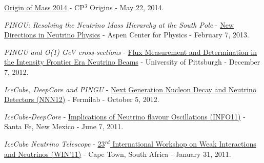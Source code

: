 \documentclass[a4paper,11pt]{article}
\begin{document}
\begin{multicols}{2}
\begin{etaremune}[topsep=0pt,itemsep=4pt,partopsep=0pt,parsep=0pt]
{\href{http://cp3-origins.dk/events/meetings/mass2014}{Origin of Mass 2014} - CP$^3$ Origins - May 22, 2014.}
%
\item{\textit{PINGU: Resolving the Neutrino Mass Hierarchy at the South Pole} - 
\href{https://indico.cern.ch/event/224351/}{New Directions in Neutrino Physics} - Aspen Center for Physics  - February 7, 2013.}
%
\item{ \textit{PINGU and O(1) GeV cross-sections} - 
\href{http://www.pitt.edu/~vipres/program_nu_flux.html}{Flux Measurement and Determination in the Intensity Frontier Era Neutrino Beams} - University of Pittsburgh - December 7, 2012.}
%
\item{\textit{IceCube, DeepCore and PINGU} - 
\href{http://conferences.fnal.gov/nnn12/}{Next Generation Nucleon Decay and Neutrino Detectors (NNN12)} - Fermilab - October 5, 2012.}
%
\item{ \textit{IceCube-DeepCore} - 
\href{http://alexfriedland.com/info11/}{Implications of Neutrino flavour Oscillations (INFO11)} - Santa Fe, New Mexico - June 7, 2011.}
%
\item{\textit{IceCube Neutrino Telescope} - 
\href{http://www.phy.uct.ac.za/conf/Win11/}{23$^{rd}$ International Workshop on Weak Interactions and Neutrinos (WIN'11)} - Cape Town, South Africa - January 31, 2011.}
%
\end{etaremune}
\end{multicols}
\end{document}
